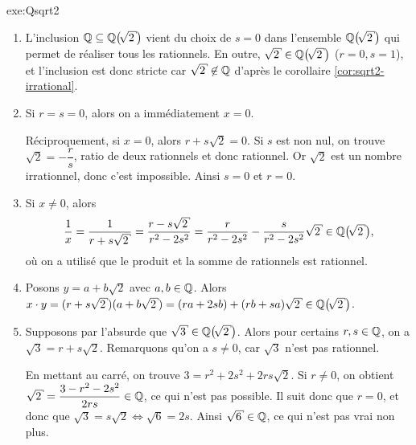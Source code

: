 

{} {exe:Qsqrt2}{
	\begin{enumerate}
		\item
		L'inclusion $\Q \subseteq \Qsqrt2$ vient du choix de $s=0$ dans l'ensemble $\Qsqrt2$ qui permet de réaliser tous les rationnels.
		En outre, $\sqrt2 \in \Qsqrt2$ ($r=0, s=1$), et l'inclusion est donc stricte car $\sqrt2\not\in\Q$ d'après le corollaire \ref{cor:sqrt2-irrational}.
		\item
		Si $r=s=0$, alors on a immédiatement $x=0$.
		
		Réciproquement, si $x=0$, alors $r+s\sqrt2 = 0$.
		Si $s$ est non nul, on trouve $\sqrt2 = -\dfrac{r}s$, ratio de deux rationnels et donc rationnel.
		Or $\sqrt2$ est un nombre irrationnel, donc c'est impossible.
		Ainsi $s=0$ et $r=0$.
		
		\item
		Si $x\neq0$, alors 
			\[ \dfrac1x = \dfrac1{r+s\sqrt2} = \dfrac{r-s\sqrt2}{r^2 - 2s^2} = \dfrac{r}{r^2 - 2s^2} - \dfrac{s}{r^2 - 2s^2} \sqrt2 \in \Qsqrt{2}, \]
		où on a utilisé que le produit et la somme de rationnels est rationnel.
		
		\item
		Posons $y= a + b\sqrt2$ avec $a, b\in\mathbb{Q}$.
		Alors $x\cdot y = (r+s\sqrt2)(a+b\sqrt2) = (ra + 2sb) + (rb + sa)\sqrt2 \in \Qsqrt{2}$.
		
		\item
		Supposons par l'absurde que $\sqrt3\in\Qsqrt2$.
		Alors pour certains $r, s\in\mathbb{Q}$, on a $\sqrt3 = r+s\sqrt2$.
		Remarquons qu'on a $s\neq0$, car $\sqrt3$ n'est pas rationnel.
		
		En mettant au carré, on trouve $3 = r^2 + 2s^2 + 2rs\sqrt2$.
		Si $r \neq 0$, on obtient $\sqrt2 = \dfrac{3-r^2 -2s^2}{2rs} \in \Q$, ce qui n'est pas possible.
		Il suit donc que $r=0$, et donc que $\sqrt3 = s\sqrt2 \iff \sqrt6 = 2s$.
		Ainsi $\sqrt6 \in\Q$, ce qui n'est pas vrai non plus. \Large\Lightning
	\end{enumerate}
}

